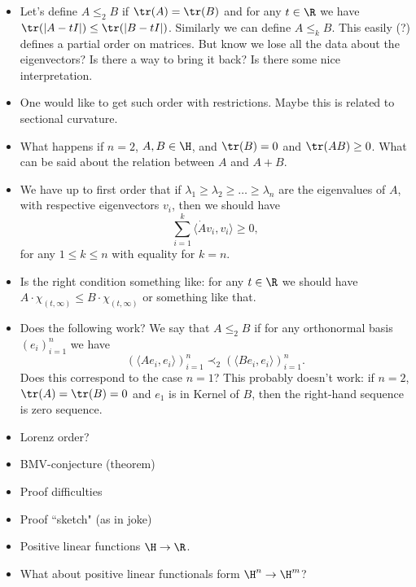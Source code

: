 \begin{itemize}
	\item Let's define $A \leq_{2} B$ if $\tr(A) = \tr(B)$ and for any $t \in \R$ we have $\tr(|A - t I|) \leq \tr(|B - t I|)$. Similarly we can define $A \leq_{k} B$. This easily (?) defines a partial order on matrices. But know we lose all the data about the eigenvectors? Is there a way to bring it back? Is there some nice interpretation.
	\item One would like to get such order with restrictions. Maybe this is related to sectional curvature.
	\item What happens if $n = 2$, $A, B \in \H$, and $\tr(B) = 0$ and $\tr(AB) \geq 0$. What can be said about the relation between $A$ and $A + B$.
	\item We have up to first order that if $\lambda_{1} \geq \lambda_{2} \geq \ldots \geq \lambda_{n}$ are the eigenvalues of $A$, with respective eigenvectors $v_{i}$, then we should have
	\[
		\sum_{i = 1}^{k} \langle \dot{A} v_{i}, v_{i}\rangle \geq 0,
	\]
	for any $1 \leq k \leq n$ with equality for $k = n$.
	\item Is the right condition something like: for any $t \in \R$ we should have $A \cdot \chi_{(t, \infty)} \leq B \cdot \chi_{(t, \infty)}$ or something like that.
	\item Does the following work? We say that $A \leq_{2} B$ if for any orthonormal basis $(e_{i})_{i = 1}^{n}$ we have
	\[
		(\langle A e_{i}, e_{i} \rangle)_{i = 1}^{n} \prec_{2} (\langle B e_{i}, e_{i} \rangle)_{i = 1}^{n}.
	\]
	Does this correspond to the case $n = 1$? This probably doesn't work: if $n = 2$, $\tr(A) = \tr(B) = 0$ and $e_{1}$ is in Kernel of $B$, then the right-hand sequence is zero sequence.
	\item Lorenz order?
	\item BMV-conjecture (theorem)
	\item Proof difficulties
	\item Proof ``sketch" (as in joke)
	\item Positive linear functions $\H \to \R$.
	\item What about positive linear functionals form $\H^{n} \to \H^{m}$?
\end{itemize}

